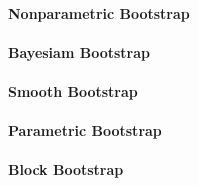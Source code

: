 \paragraph{Nonparametric Bootstrap}

\paragraph{Bayesiam Bootstrap}

\paragraph{Smooth Bootstrap}

\paragraph{Parametric Bootstrap}

\paragraph{Block Bootstrap}
